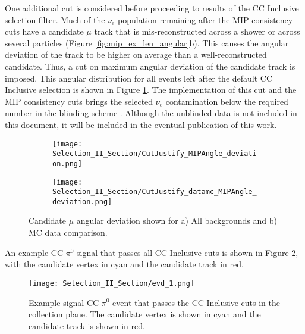 One additional cut is considered before proceeding to results of the CC Inclusive selection filter.  Much of the $\nu_e$ population remaining after the MIP consistency cuts have a candidate $\mu$ track that is mis-reconstructed across a shower or across several particles (Figure \ref{fig:mip_ex_len_angular}b).  This causes the angular deviation of the track to be higher on average than a well-reconstructed candidate.  Thus, a cut on maximum angular deviation of the candidate track is imposed.  This angular distribution for all events left after the default CC Inclusive selection is shown in Figure \ref{fig:cutjust_sel2_multall_deviation}.  The implementation of this cut and the MIP consistency cuts brings the selected $\nu_e$ contamination below the required number in the blinding scheme \cite{bib:jz_unblinding_note}. Although the unblinded data is not included in this document, it will be included in the eventual publication of this work.
\begin{figure}[H]
  \begin{subfigure}[t]{0.35\textwidth}
\texttt{[image: Selection\_II\_Section/CutJustify\_MIPAngle\_deviation.png]}
    \caption{ }
  \end{subfigure} 
  \hspace{15mm}
  \begin{subfigure}[t]{0.35\textwidth}
\texttt{[image: Selection\_II\_Section/CutJustify\_datamc\_MIPAngle\_deviation.png]}
    \caption{ }
  \end{subfigure} 
\caption{ Candidate $\mu$ angular deviation shown for a) All backgrounds and b) MC data comparison. }
\label{fig:cutjust_sel2_multall_deviation}
\end{figure}

An example CC $\pi^0$ signal that passes all CC Inclusive cuts is shown in Figure \ref{fig:evd_1}, with the candidate vertex in cyan and the candidate track in red.

\begin{figure}[H]
	\centering
	\texttt{[image: Selection\_II\_Section/evd\_1.png]}
   	\caption{ Example signal CC $\pi^0$ event that passes the CC Inclusive cuts in the collection plane.  The candidate vertex is shown in cyan and the candidate track is shown in red. }
\label{fig:evd_1}
\end{figure}


\clearpage

